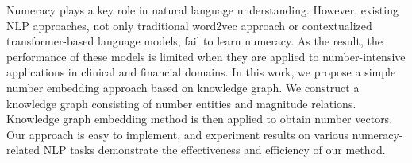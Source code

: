 Numeracy plays a key role in natural language understanding. However, existing NLP approaches, not only traditional word2vec approach or contextualized transformer-based language models, fail to learn numeracy. As the result, the performance of these models is limited when they are applied to number-intensive applications in clinical and financial domains. In this work, we propose a simple number embedding approach based on knowledge graph. We construct a knowledge graph consisting of number entities and magnitude relations. Knowledge graph embedding method is then applied to obtain number vectors. Our approach is  easy to implement, and experiment results on various numeracy-related NLP tasks demonstrate the effectiveness and efficiency of our method.
